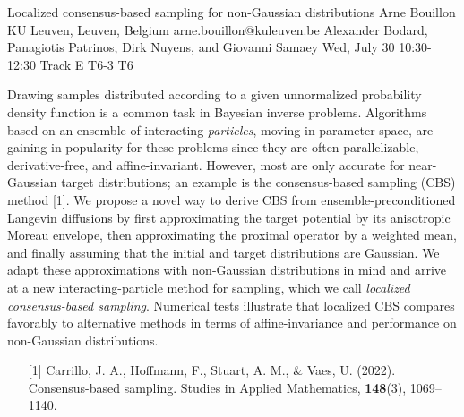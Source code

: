 \begin{talk}
  {Localized consensus-based sampling for non-Gaussian distributions}%
  {Arne Bouillon}%
  {KU Leuven, Leuven, Belgium}%
  {arne.bouillon@kuleuven.be}%
  {Alexander Bodard, Panagiotis Patrinos, Dirk Nuyens, and Giovanni Samaey}%
  {}%
  {Wed, July 30 10:30-12:30 Track E}%
  {T6-3}%
  {T6}%
  
				

  Drawing samples distributed according to a given unnormalized probability density function is a common task in Bayesian inverse problems. Algorithms based on an ensemble of interacting \emph{particles}, moving in parameter space, are gaining in popularity for these problems since they are often parallelizable, derivative-free, and affine-invariant. However, most are only accurate for near-Gaussian target distributions; an example is the consensus-based sampling (CBS) method [1]. We propose a novel way to derive CBS from ensemble-preconditioned Langevin diffusions by first approximating the target potential by its anisotropic Moreau envelope, then approximating the proximal operator by a weighted mean, and finally assuming that the initial and target distributions are Gaussian. We adapt these approximations with non-Gaussian distributions in mind and arrive at a new interacting-particle method for sampling, which we call \emph{localized consensus-based sampling}. Numerical tests illustrate that localized CBS compares favorably to alternative methods in terms of affine-invariance and performance on non-Gaussian distributions.
\medskip

\begin{enumerate}
  \item[{[1]}] Carrillo, J. A., Hoffmann, F., Stuart, A. M., \& Vaes, U. (2022). Consensus-based sampling. Studies in Applied Mathematics, \textbf{148}(3), 1069--1140.
\end{enumerate}
\end{talk}

